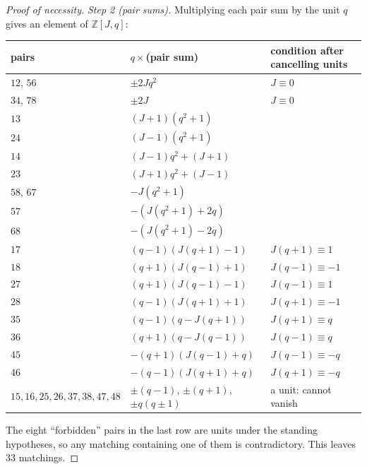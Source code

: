 \documentclass[11pt]{article}
\theoremstyle{definition}
\newcommand{\Z}{\mathbb Z}
\begin{document}
\begin{proof}[Proof of necessity]
\emph{Step 2 (pair sums).}  Multiplying each pair sum by the unit $q$
gives an element of $\Z[J,q]$:
\begin{center}
\begin{tabular}{@{}lll@{}}
\toprule
pairs & $q\times$(pair sum) & condition after cancelling units\\
\midrule
$12$, $56$ & $\pm2Jq^2$ & $J\equiv0$\\
$34$, $78$ & $\pm2J$ & $J\equiv0$\\
$13$ & $(J+1)(q^2+1)$ & \\
$24$ & $(J-1)(q^2+1)$ & \\
$14$ & $(J-1)q^2+(J+1)$ & \\
$23$ & $(J+1)q^2+(J-1)$ & \\
$58$, $67$ & $-J(q^2+1)$ & \\
$57$ & $-(J(q^2+1)+2q)$ & \\
$68$ & $-(J(q^2+1)-2q)$ & \\
$17$ & $(q-1)(J(q+1)-1)$ & $J(q+1)\equiv1$\\
$18$ & $(q+1)(J(q-1)+1)$ & $J(q-1)\equiv-1$\\
$27$ & $(q+1)(J(q-1)-1)$ & $J(q-1)\equiv1$\\
$28$ & $(q-1)(J(q+1)+1)$ & $J(q+1)\equiv-1$\\
$35$ & $(q-1)(q-J(q+1))$ & $J(q+1)\equiv q$\\
$36$ & $(q+1)(q-J(q-1))$ & $J(q-1)\equiv q$\\
$45$ & $-(q+1)(J(q-1)+q)$ & $J(q-1)\equiv-q$\\
$46$ & $-(q-1)(J(q+1)+q)$ & $J(q+1)\equiv-q$\\
$15,16,25,26,37,38,47,48$ & $\pm(q-1)$, $\pm(q+1)$, $\pm q(q\pm1)$ & a unit: cannot vanish\\
\bottomrule
\end{tabular}
\end{center}
The eight ``forbidden'' pairs in the last row are units under the
standing hypotheses, so any matching containing one of them is
contradictory.  This leaves $33$ matchings.


\end{proof}
\end{document}
